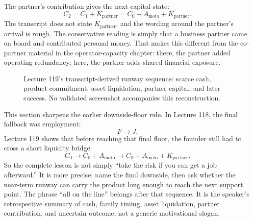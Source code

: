 \documentclass[11pt,oneside]{book}
\begin{document}
The partner's contribution gives the next capital state:
\[
C_2=C_1+K_{\mathrm{partner}}
=
C_0+A_{\mathrm{moto}}+K_{\mathrm{partner}}.
\]
The transcript does not state \(K_{\mathrm{partner}}\), and the wording around the partner's arrival is rough. The conservative reading is simply that a business partner came on board and contributed personal money. That makes this different from the co-partner material in the operator-capacity chapter: there, the partner added operating redundancy; here, the partner adds shared financial exposure.

\begin{figure}
\centering
{}
\caption{Lecture 119's transcript-derived runway sequence: scarce cash, product commitment, asset liquidation, partner capital, and later success. No validated screenshot accompanies this reconstruction.}
\end{figure}

This section sharpens the earlier downside-floor rule. In Lecture 118, the final fallback was employment:
\[
F\longrightarrow J.
\]
Lecture 119 shows that before reaching that final floor, the founder still had to cross a short liquidity bridge:
\[
C_0
\longrightarrow
C_0+A_{\mathrm{moto}}
\longrightarrow
C_0+A_{\mathrm{moto}}+K_{\mathrm{partner}}.
\]
So the complete lesson is not simply ``take the risk if you can get a job afterward.'' It is more precise: name the final downside, then ask whether the near-term runway can carry the product long enough to reach the next support point. The phrase ``all on the line'' belongs after that sequence. It is the speaker's retrospective summary of cash, family timing, asset liquidation, partner contribution, and uncertain outcome, not a generic motivational slogan.
\end{document}
